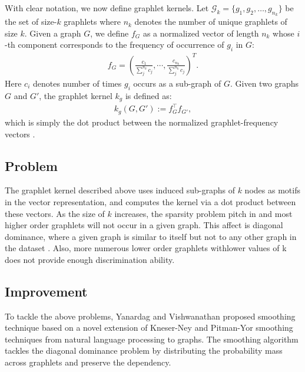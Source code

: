 With clear notation, we now define graphlet kernels. Let $\mathcal{G}_{k} = \{ g_{1}, g_2, \ldots, g_{n_k} \}$ be the set of
size-$k$ graphlets where $n_k$ denotes the number of unique graphlets of
size $k$.  Given a graph $G$, we define $f_{G}$ as a normalized vector
of length $n_k$ whose $i$-th component corresponds to the frequency of
occurrence of $g_{i}$ in $G$:
%
\begin{align}
  \label{eq:gk}
  f_G = (\frac{c_1}{\sum_{j}^{n_k} c_j}, \cdots, \frac{c_{n_k}}{\sum_{j}^{n_k} c_j})^T.
\end{align}
%
Here $c_i$ denotes number of times $g_i$ occurs as a sub-graph of
$G$. Given two graphs $G$ and $G'$, the graphlet kernel $k_{g}$ is
defined as:
\begin{align}
  \label{eq:graphlet-kernel}
  k_{g}(G, G'):= f_{G}^{\top} f_{G'},
\end{align} 
which is simply the dot product between the normalized
graphlet-frequency vectors \citep{Yanardag2015B}.

\subsection{Problem}

The graphlet kernel described above uses induced sub-graphs of $k$ nodes as motifs in the vector representation, and computes the kernel via a dot product between these vectors.  As  the size of $k$ increases, the sparsity problem pitch in and most higher order graphlets will not occur in a given graph. This affect is diagonal dominance, where a given graph is similar to itself but not to any other graph in the dataset \citep{Yanardag2015B}. Also, more numerous lower order graphlets withlower values of k does not provide enough discrimination ability.

\subsection{Improvement}

To tackle the above problems, Yanardag and Vishwanathan \citep{Yanardag2015B} proposed  smoothing technique based on a novel extension of Kneser-Ney and Pitman-Yor smoothing techniques from
natural language processing to graphs. The smoothing algorithm  tackles the diagonal dominance problem by distributing the probability mass
across graphlets and preserve the dependency.
 


